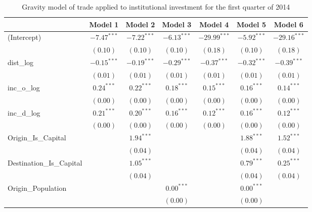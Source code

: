 \begin{table}
	\small
	\begin{center}
		\caption[Gravity Model of Trade for Q1 2014]{Gravity model of trade applied to institutional investment for the first quarter of 2014}
		\begin{tabular}{l c c c c c c }
			\hline
			& Model 1 & Model 2 & Model 3 & Model 4 & Model 5 & Model 6 \\
			\hline
			(Intercept)                  & $-7.47^{***}$ & $-7.22^{***}$ & $-6.13^{***}$ & $-29.99^{***}$ & $-5.92^{***}$ & $-29.16^{***}$ \\
			& $(0.10)$      & $(0.10)$      & $(0.10)$      & $(0.18)$       & $(0.10)$      & $(0.18)$       \\
			dist\_log                    & $-0.15^{***}$ & $-0.19^{***}$ & $-0.29^{***}$ & $-0.37^{***}$  & $-0.32^{***}$ & $-0.39^{***}$  \\
			& $(0.01)$      & $(0.01)$      & $(0.01)$      & $(0.01)$       & $(0.01)$      & $(0.01)$       \\
			inc\_o\_log                  & $0.24^{***}$  & $0.22^{***}$  & $0.18^{***}$  & $0.15^{***}$   & $0.16^{***}$  & $0.14^{***}$   \\
			& $(0.00)$      & $(0.00)$      & $(0.00)$      & $(0.00)$       & $(0.00)$      & $(0.00)$       \\
			inc\_d\_log                  & $0.21^{***}$  & $0.20^{***}$  & $0.16^{***}$  & $0.12^{***}$   & $0.16^{***}$  & $0.12^{***}$   \\
			& $(0.00)$      & $(0.00)$      & $(0.00)$      & $(0.00)$       & $(0.00)$      & $(0.00)$       \\
			Origin\_Is\_Capital          &               & $1.94^{***}$  &               &                & $1.88^{***}$  & $1.52^{***}$   \\
			&               & $(0.04)$      &               &                & $(0.04)$      & $(0.04)$       \\
			Destination\_Is\_Capital     &               & $1.05^{***}$  &               &                & $0.79^{***}$  & $0.25^{***}$   \\
			&               & $(0.04)$      &               &                & $(0.04)$      & $(0.04)$       \\
			Origin\_Population           &               &               & $0.00^{***}$  &                & $0.00^{***}$  &                \\
			&               &               & $(0.00)$      &                & $(0.00)$      &                \\

\end{tabular}
\end{center}
\end{table}
